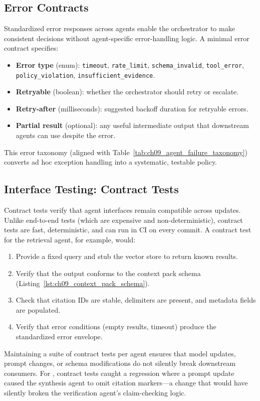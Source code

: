 \subsection{Error Contracts}
Standardized error responses across agents enable the orchestrator to make consistent decisions without agent-specific error-handling logic. A minimal error contract specifies:
\begin{itemize}[leftmargin=1.5em, itemsep=2pt]
  \item \textbf{Error type} (enum): \texttt{timeout}, \texttt{rate\_limit}, \texttt{schema\_invalid}, \texttt{tool\_error}, \texttt{policy\_violation}, \texttt{insufficient\_evidence}.
  \item \textbf{Retryable} (boolean): whether the orchestrator should retry or escalate.
  \item \textbf{Retry-after} (milliseconds): suggested backoff duration for retryable errors.
  \item \textbf{Partial result} (optional): any useful intermediate output that downstream agents can use despite the error.
\end{itemize}
This error taxonomy (aligned with Table~\ref{tab:ch09_agent_failure_taxonomy}) converts ad hoc exception handling into a systematic, testable policy.

\subsection{Interface Testing: Contract Tests}
Contract tests verify that agent interfaces remain compatible across updates. Unlike end-to-end tests (which are expensive and non-deterministic), contract tests are fast, deterministic, and can run in CI on every commit. A contract test for the retrieval agent, for example, would:
\begin{enumerate}[leftmargin=1.5em, itemsep=2pt]
  \item Provide a fixed query and stub the vector store to return known results.
  \item Verify that the output conforms to the context pack schema (Listing~\ref{lst:ch09_context_pack_schema}).
  \item Check that citation IDs are stable, delimiters are present, and metadata fields are populated.
  \item Verify that error conditions (empty results, timeout) produce the standardized error envelope.
\end{enumerate}
Maintaining a suite of contract tests per agent ensures that model updates, prompt changes, or schema modifications do not silently break downstream consumers. For \ishtar{}, contract tests caught a regression where a prompt update caused the synthesis agent to omit citation markers---a change that would have silently broken the verification agent's claim-checking logic.

